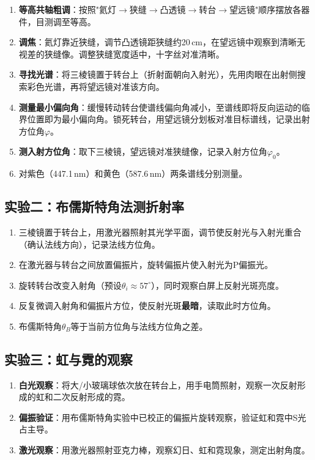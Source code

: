 \documentclass[UTF8]{article}
\begin{document}
\begin{enumerate}
    \item \textbf{等高共轴粗调}：按照"氦灯$\to$狭缝$\to$凸透镜$\to$转台$\to$望远镜"顺序摆放各器件，目测调至等高。
    \item \textbf{调焦}：氦灯靠近狭缝，调节凸透镜距狭缝约20\,cm，在望远镜中观察到清晰无视差的狭缝像。调整狭缝宽度适中，十字丝对准清晰。
    \item \textbf{寻找光谱}：将三棱镜置于转台上（折射面朝向入射光），先用肉眼在出射侧搜索彩色光谱，再将望远镜对准该方向。
    \item \textbf{测量最小偏向角}：缓慢转动转台使谱线偏向角减小，至谱线即将反向运动的临界位置即为最小偏向角。锁死转台，用望远镜分划板对准目标谱线，记录出射方位角$\varphi$。
    \item \textbf{测入射方位角}：取下三棱镜，望远镜对准狭缝像，记录入射方位角$\varphi_0$。
    \item 对紫色（447.1\,nm）和黄色（587.6\,nm）两条谱线分别测量。
\end{enumerate}

\subsection{实验二：布儒斯特角法测折射率}

\begin{enumerate}
    \item 三棱镜置于转台上，用激光器照射其光学平面，调节使反射光与入射光重合（确认法线方向），记录法线方位角。
    \item 在激光器与转台之间放置偏振片，旋转偏振片使入射光为P偏振光。
    \item 旋转转台改变入射角（预设$\theta_i \approx 57^\circ$），同时观察白屏上反射光斑亮度。
    \item 反复微调入射角和偏振片方位，使反射光斑\textbf{最暗}，读取此时方位角。
    \item 布儒斯特角$\theta_B$等于当前方位角与法线方位角之差。
\end{enumerate}

\subsection{实验三：虹与霓的观察}

\begin{enumerate}
    \item \textbf{白光观察}：将大/小玻璃球依次放在转台上，用手电筒照射，观察一次反射形成的虹和二次反射形成的霓。
    \item \textbf{偏振验证}：用布儒斯特角实验中已校正的偏振片旋转观察，验证虹和霓中S光占主导。
    \item \textbf{激光观察}：用激光器照射亚克力棒，观察幻日、虹和霓现象，测定出射角度。
\end{enumerate}
\end{document}
